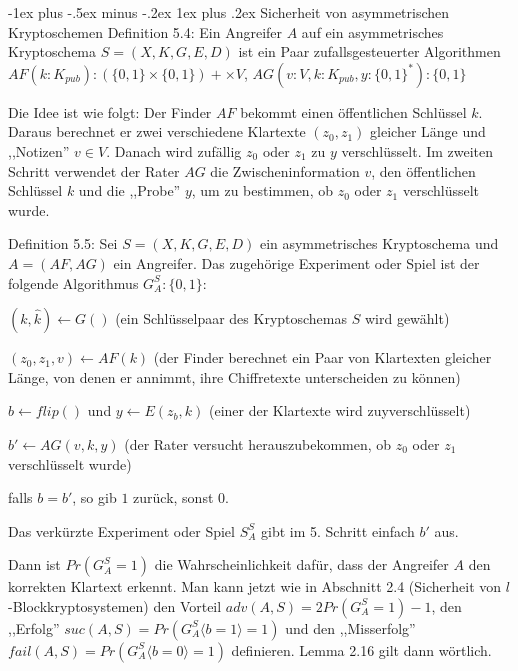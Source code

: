 \documentclass[a4paper]{article}
\makeatletter
\renewcommand{\subsubsection}{\@startsection{subsubsection}{3}{0mm}%
 {-1ex plus -.5ex minus -.2ex}%
 {1ex plus .2ex}%
 {\normalfont\small\bfseries}}
\makeatother
\begin{document}
\begin{multicols}{3}
        \subsubsection{Sicherheit von asymmetrischen Kryptoschemen}
        Definition 5.4: Ein Angreifer $A$ auf ein asymmetrisches Kryptoschema $S= (X,K,G,E,D)$ ist ein Paar zufallsgesteuerter Algorithmen $AF(k:K_{pub}):(\{0,1\}\times\{0,1\})+\times V$, $AG(v:V,k:K_{pub}, y:\{0,1\}^*) :\{0,1\}$

        Die Idee ist wie folgt: Der Finder $AF$ bekommt einen öffentlichen Schlüssel $k$. Daraus berechnet er zwei verschiedene Klartexte $(z_0,z_1)$ gleicher Länge und ,,Notizen'' $v\in V$. Danach wird zufällig $z_0$ oder $z_1$ zu $y$ verschlüsselt. Im zweiten Schritt verwendet der Rater $AG$ die Zwischeninformation $v$, den öffentlichen Schlüssel $k$ und die ,,Probe'' $y$, um zu bestimmen, ob $z_0$ oder $z_1$ verschlüsselt wurde.

        Definition 5.5: Sei $S=(X,K,G,E,D)$ ein asymmetrisches Kryptoschema und $A=(AF,AG)$ ein Angreifer. Das zugehörige Experiment oder Spiel ist der folgende Algorithmus $G^S_A:\{0,1\}$:
        \begin{enumerate*}
            \item $(k,\hat{k})\leftarrow G()$ (ein Schlüsselpaar des Kryptoschemas $S$ wird gewählt)
            \item $(z_0,z_1,v)\leftarrow AF(k)$ (der Finder berechnet ein Paar von Klartexten gleicher Länge, von denen er annimmt, ihre Chiffretexte unterscheiden zu können)
            \item $b\leftarrow flip()$ und $y\leftarrow E(z_b,k)$ (einer der Klartexte wird zuyverschlüsselt)
            \item $b'\leftarrow AG(v,k,y)$ (der Rater versucht herauszubekommen, ob $z_0$ oder $z_1$ verschlüsselt wurde)
            \item falls $b=b'$, so gib $1$ zurück, sonst $0$.
            \begin{itemize*}
                \item Das verkürzte Experiment oder Spiel $S^S_A$ gibt im 5. Schritt einfach $b'$ aus.
            \end{itemize*}
        \end{enumerate*}

        Dann ist $Pr(G^S_A= 1)$ die Wahrscheinlichkeit dafür, dass der Angreifer $A$ den korrekten Klartext erkennt. Man kann jetzt wie in Abschnitt 2.4 (Sicherheit von $l$-Blockkryptosystemen) den Vorteil $adv(A,S) = 2 Pr(G^S_A = 1)- 1$, den ,,Erfolg'' $suc(A,S) = Pr(G^S_A\langle b = 1\rangle = 1)$ und den ,,Misserfolg'' $fail(A,S) =Pr(G^S_A\langle b= 0\rangle = 1)$ definieren. Lemma 2.16 gilt dann wörtlich.


\end{multicols}
\end{document}
